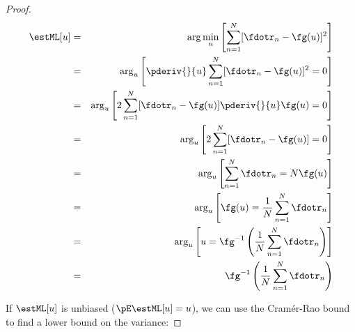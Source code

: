 \begin{proof}
\begin{eqnarray*}
   \estML[u]
     &=& \arg\min_u 
         \left[ \sum_{n=1}^N [\fdotr_n-\fg( u )]^2 \right]
   \\&=& \arg_u\left[
            \pderiv{}{ u }\sum_{n=1}^N [\fdotr_n-\fg( u )]^2 = 0
         \right]
   \\&=& \arg_u\left[
             2\sum_{n=1}^N [\fdotr_n-\fg( u )]\pderiv{}{ u }\fg( u ) = 0
         \right]
   \\&=& \arg_u\left[
             2\sum_{n=1}^N [\fdotr_n-\fg( u )] = 0
         \right]
   \\&=& \arg_u\left[
             \sum_{n=1}^N \fdotr_n = N \fg( u )
         \right]
   \\&=& \arg_u\left[
             \fg( u ) = \frac{1}{N}\sum_{n=1}^N \fdotr_n
         \right]
   \\&=& \arg_u\left[
              u  = \fg^{-1}\left(\frac{1}{N}\sum_{n=1}^N \fdotr_n\right)
         \right]
   \\&=& \fg^{-1}\left(\frac{1}{N}\sum_{n=1}^N \fdotr_n\right)
\end{eqnarray*}


If $\estML[u]$ is unbiased ($\pE\estML[u]= u $), we can use
the Cram\'er-Rao bound to find a lower bound on the variance:


\end{proof}
